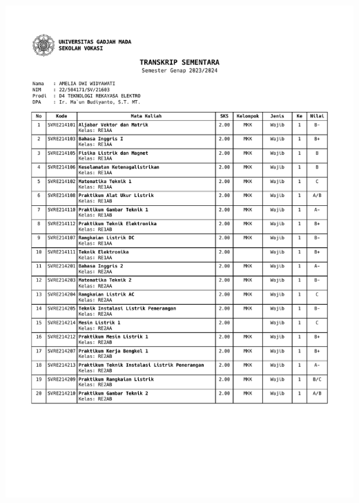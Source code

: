 \begin{itemize}
	\includegraphics[scale=0.7,page=2]{dokumen/transkrip_amelia.pdf}
	\newpage

\end{itemize}
